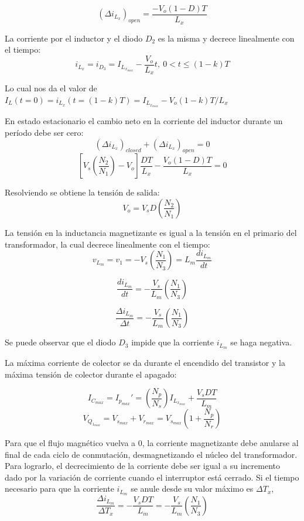 $$ (\Delta i_{L_x})_{open}=\frac{-V_o(1-D)T}{L_x} $$

La corriente por el inductor y el diodo $D_2$ es la misma y decrece linealmente con el tiempo:
$$ i_{L_x}=i_{D_3}=I_{L_{x_{max}}}-\frac{V_o}{L_x}t,\ 0<t\leq (1-k)T $$

Lo cual nos da el valor de $I_L(t=0)=i_{L_x}(t=(1-k)T)=I_{L_{x_{max}}}-V_o(1-k)T/L_x$

En estado estacionario el cambio neto en la corriente del inductor durante un período debe ser cero:
$$ (\Delta i_{L_x})_{closed}+(\Delta i_{L_x})_{open}=0 $$
$$ \left[V_s\left(\frac{N_2}{N_1}\right)-V_o\right]\frac{DT}{L_x}-\frac{V_o(1-D)T}{L_x}=0 $$

Resolviendo se obtiene la tensión de salida:
$$ V_o=V_sD\left(\frac{N_2}{N_1}\right) $$

La tensión en la inductancia magnetizante es igual a la tensión en el primario del transformador, la cual decrece linealmente con el tiempo:
$$ v_{L_m}=v_1=-V_s\left(\frac{N_1}{N_3}\right)=L_m\frac{di_{L_m}}{dt} $$

$$ \frac{di_{L_m}}{dt}=-\frac{V_s}{L_m}\left(\frac{N_1}{N_3}\right) $$

$$ \frac{\Delta i_{L_m}}{\Delta t}=-\frac{V_s}{L_m}\left(\frac{N_1}{N_3}\right) $$ 

Se puede observar que el diodo $D_3$ impide que la corriente $i_{L_m}$ se haga negativa. 

La máxima corriente de colector se da durante el encendido del transistor y la máxima tensión de colector durante el apagado:

$$ I_{C_{max}}=I_{p_{max}}'=\left(\frac{N_p}{N_s}\right)I_{L_{x_{max}}}+\frac{V_sDT}{L_m} $$
$$ V_{Q_{1_{max}}}=V_{s_{max}}+V_{r_{max}}=V_{s_{max}}\left(1+\frac{N_p}{N_r}\right) $$

Para que el flujo magnético vuelva a 0, la corriente magnetizante debe anularse al final de cada ciclo de conmutación, desmagnetizando el núcleo del transformador.
Para lograrlo, el decrecimiento de la corriente debe ser igual a su incremento dado por la variación de corriente cuando el interruptor está cerrado. 
Si el tiempo necesario para que la corriente $i_{L_m}$ se anule desde su valor máximo es $\Delta T_x$, 
$$ \frac{\Delta i_{L_m}}{\Delta T_x}=-\frac{V_sDT}{L_m}=-\frac{V_s}{L_m}\left(\frac{N_1}{N_3}\right) $$

